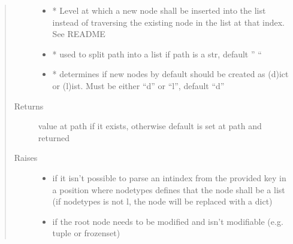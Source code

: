 \documentclass[a4paper,10pt,english]{sphinxmanual}
\begin{document}
\begin{fulllineitems}
\begin{fulllineitems}
\begin{quote}
\begin{description}
\begin{itemize}
\item {}
\sphinxAtStartPar
{} \textendash{} * Level at which a new node shall be inserted into the list instead of traversing the
existing node in the list at that index. See README

\item {}
\sphinxAtStartPar
{} \textendash{} * used to split path into a list if path is a str, default ” “

\item {}
\sphinxAtStartPar
{} \textendash{} * determines if new nodes by default should be created as (d)ict or (l)ist. Must be
either “d” or “l”, default “d”

\end{itemize}

\item[{Returns}] \leavevmode
\sphinxAtStartPar
value at path if it exists, otherwise default is set at path and returned

\item[{Raises}] \leavevmode\begin{itemize}
\item {}
\sphinxAtStartPar
{} \textendash{} if it isn’t possible to parse an int\sphinxhyphen{}index from the provided key in a position where node\sphinxhyphen{}types
    defines that the node shall be a list (if node\sphinxhyphen{}types is not l, the node will be replaced with a dict)

\item {}
\sphinxAtStartPar
{} \textendash{} if the root node needs to be modified and isn’t modifiable (e.g. tuple or frozenset)

\end{itemize}

\end{description}\end{quote}

\end{fulllineitems}



\end{fulllineitems}
\end{document}
